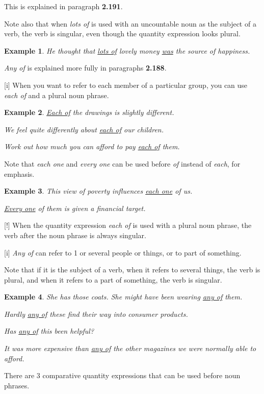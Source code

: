 \documentclass[oneside]{book}
\numberwithin{equation}{section}
\newtheorem{example}{Example}[section]
\begin{document}
This is explained in paragraph \textbf{2.191}.

%
Note also that when \textit{lots of} is used with an uncountable noun as the subject of a verb, the verb is singular, even though the quantity expression looks plural.
\begin{example}
    He thought that \underline{lots of} lovely money \underline{was} the source of happiness.
\end{example}
\textit{Any of} is explained more fully in paragraphs \textbf{2.188}.

%
\noindent{} [i] When you want to refer to each member of a particular group, you can use \textit{each of} and a plural noun phrase.
\begin{example}
    \underline{Each of} the drawings is slightly different.
    
    We feel quite differently about \underline{each of} our children.
    
    Work out how much you can afford to pay \underline{each of} them.
\end{example}
Note that \textit{each one} and \textit{every one} can be used before \textit{of} instead of \textit{each}, for emphasis.
\begin{example}
    This view of poverty influences \underline{each one} of us.
    
    \underline{Every one} of them is given a financial target.
\end{example}
%
\noindent{} [!] When the quantity expression \textit{each of} is used with a plural noun phrase, the verb after the noun phrase is always singular.

%
\noindent{} [i] \textit{Any of} can refer to 1 or several people or things, or to part of something.

Note that if it is the subject of a verb, when it refers to several things, the verb is plural, and when it refers to a part of something, the verb is singular.
\begin{example}
    She has those coats. She might have been wearing \underline{any of} them.
    
    Hardly \underline{any of} these find their way into consumer products.
    
    Has \underline{any of} this been helpful?
    
    It was more expensive than \underline{any of} the other magazines we were normally able to afford.
\end{example}
%
\noindent{} There are 3 comparative quantity expressions that can be used before noun phrases.
\end{document}
